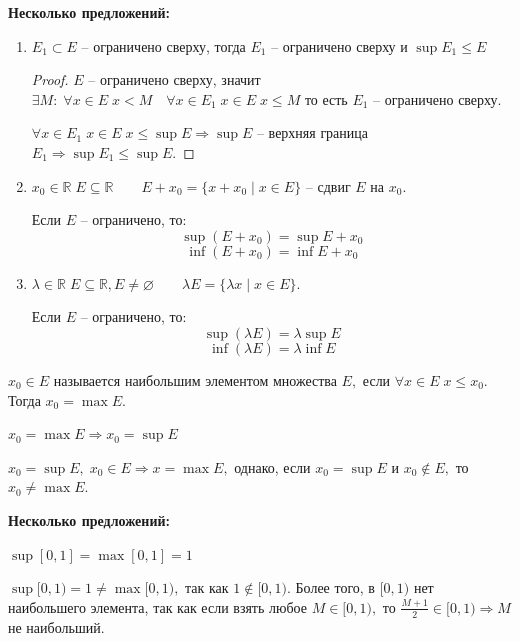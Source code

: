 \newpage
\par\medskip \textbf{Несколько предложений:}\par
\begin{enumerate}
\item $E_1\subset E$ -- ограничено сверху, тогда $E_1$ -- ограничено сверху и $\sup E_1\leq E$
\begin{proof}
$E$ -- ограничено сверху, значит $\exists M: \; \forall x\in E \; x<M \quad \forall x\in E_1 \; x\in E\; x\leq M$ то есть $E_1$ -- ограничено сверху.
\par $\forall x\in E_1\; x\in E \; x\leq \sup E \Rightarrow \sup E$ -- верхняя граница $E_1 \Rightarrow \sup E_1\leq \sup E.$
\end{proof}
\item $x_0\in\mathbb{R} \; E\subseteq\mathbb{R} \qquad E+x_0=\{x+x_0\mid x\in E\}$ -- сдвиг $E$ на $x_0.$
\par Если $E$ -- ограничено, то:
$$\sup\left(E+x_0\right)=\sup E+x_0$$
$$\inf\left(E+x_0\right)=\inf E+x_0$$
\item $\lambda\in\mathbb{R} \; E\subseteq\mathbb{R}, E\neq\varnothing \qquad \lambda E=\{\lambda x\mid x\in E\}.$
\par Если $E$ -- ограничено, то:
$$\sup\left(\lambda E\right)=\lambda\sup E$$
$$\inf\left(\lambda E\right)=\lambda\inf E$$
\end{enumerate}

\begin{Definition}
$x_0\in E$ называется наибольшим элементом множества $E,$ если $\forall x\in E\; x\leq x_0.$ Тогда $x_0=\max E.$
\end{Definition}

\par $x_0=\max E\Rightarrow x_0=\sup E$
\par $x_0=\sup E,\; x_0\in E \Rightarrow x=\max E,$ однако, если $x_0=\sup E$ и $x_0\notin E,$ то $x_0\neq\max E.$

\par\medskip \textbf{Несколько предложений:}\par
$\sup[0, 1] = \max[0, 1] = 1$
\par $\sup[0, 1) = 1 \neq \max[0, 1),$ так как $1\notin[0, 1).$ Более того, в $[0, 1)$ нет наибольшего элемента, так как если взять любое $M\in[0, 1),$ то $\frac{M+1}{2}\in[0, 1) \Rightarrow M$ не наибольший.
